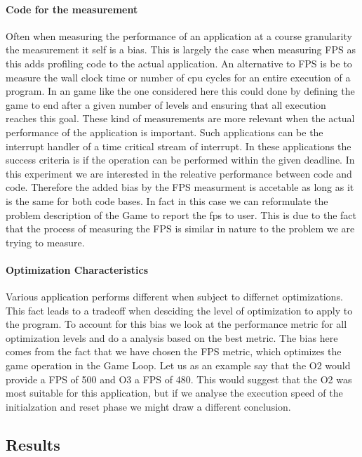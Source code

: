 \paragraph{Code for the measurement}
Often when measuring the performance of an application at a course granularity the measurement it self is a bias.
This is largely the case when measuring FPS as this adds profiling code to the actual application.
An alternative to FPS is be to measure the wall clock time or number of cpu cycles for an entire execution of a program.
In an game like the one considered here this could done by defining the game to end after a given number of levels and ensuring that all execution reaches this goal.
These kind of measurements are more relevant when the actual performance of the application is important.
Such applications can be the interrupt handler of a time critical stream of interrupt.
In these applications the success criteria is if the operation can be performed within the given deadline.
In this experiment we are interested in the releative performance between {\C} code and {\rust} code.
Therefore the added bias by the FPS measurment is accetable as long as it is the same for both code bases.
In fact in this case we can reformulate the problem description of the Game to report the fps to user.
This is due to the fact that the process of measuring the FPS is similar in nature to the problem we are trying to measure.

\paragraph{Optimization Characteristics}
Various application performs different when subject to differnet optimizations.
This fact leads to a tradeoff when desciding the level of optimization to apply to the program.
To account for this bias we look at the performance metric for all optimization levels and do a analysis based on the best metric.
The bias here comes from the fact that we have chosen the FPS metric, which optimizes the game operation in the Game Loop.
Let us as an example say that the O2 would provide a FPS of 500 and O3 a FPS of 480.
This would suggest that the O2 was most suitable for this application, but if we analyse the execution speed of the initialzation and reset phase we might draw a different conclusion.

\subsection{Results}
\label{sec:perf:res}

